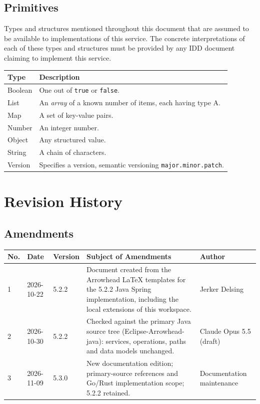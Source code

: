 \documentclass[a4paper]{arrowhead}
\newcommand{\pdef}[1]{{\textcolor{ArrowheadGrey}{#1\label{sec:model:primitives:#1}\label{sec:model:primitives:#1s}\label{sec:model:primitives:#1es}}}}
\begin{document}
\subsection{Primitives}
\label{sec:model:primitives}

Types and structures mentioned throughout this document that are assumed to be available to implementations of this service.
The concrete interpretations of each of these types and structures must be provided by any IDD document claiming to implement this service.

\noindent\begin{tabularx}{\textwidth}{| p{4.6cm} | X |} \hline
\rowcolor{gray!33} Type & Description \\ \hline
\pdef{Boolean} & One out of \texttt{true} or \texttt{false}. \\ \hline
\pdef{List} & An \textit{array} of a known number of items, each having type A. \\ \hline
\pdef{Map} & A set of key-value pairs. \\ \hline
\pdef{Number} & An integer number. \\ \hline
\pdef{Object} & Any structured value. \\ \hline
\pdef{String} & A chain of characters. \\ \hline
\pdef{Version} & Specifies a version, semantic versioning \texttt{major.minor.patch}. \\ \hline
\end{tabularx}

\newpage




\newpage

\section{Revision History}
\subsection{Amendments}

\noindent\begin{tabularx}{\textwidth}{| p{1cm} | p{3cm} | p{2cm} | X | p{4cm} |} \hline
\rowcolor{gray!33} No. & Date & Version & Subject of Amendments & Author \\ \hline

1 & 2026-10-22 & 5.2.2 & Document created from the Arrowhead LaTeX templates for the 5.2.2 Java Spring implementation, including the local extensions of this workspace. & Jerker Delsing \\ \hline
2 & 2026-10-30 & 5.2.2 & Checked against the primary Java source tree (Eclipse-Arrowhead-java): services, operations, paths and data models unchanged. & Claude Opus 5.5 (draft) \\ \hline
3 & 2026-11-09 & 5.3.0 & New documentation edition; primary-source references and Go/Rust implementation scope; 5.2.2 retained. & Documentation maintenance \\ \hline
\end{tabularx}
\end{document}
